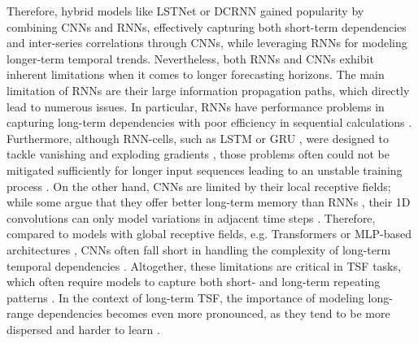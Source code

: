 \documentclass[a4paper,oneside,bibliography=totoc]{scrbook}
\begin{document}
Therefore, hybrid models like LSTNet \cite{lai_modeling_2018} or DCRNN \cite{li_diffusion_2018} gained popularity by combining CNNs and RNNs, effectively capturing both short-term dependencies and inter-series correlations through CNNs, while leveraging RNNs for modeling longer-term temporal trends. 
Nevertheless, both RNNs and CNNs exhibit inherent limitations when it comes to longer forecasting horizons. 
The main limitation of RNNs are their large information propagation paths, which directly lead to numerous issues.
In particular, RNNs have performance problems in capturing long-term dependencies with poor efficiency in sequential calculations \cite{jia_pgn_2024}.
Furthermore, although RNN-cells, such as LSTM \cite{hochreiter_long_1997} or GRU \cite{cho_learning_2014}, were designed to tackle vanishing and exploding gradients \cite{bengio_learning_1994}, those problems often could not be mitigated sufficiently for longer input sequences leading to an unstable training process \cite{zhou_informer_2021}. 
On the other hand, CNNs are limited by their local receptive fields; while some argue that they offer better long-term memory than RNNs \cite{bai_empirical_2018}, their 1D convolutions can only model variations in adjacent time steps \cite{wu_timesnet_2022}.
Therefore, compared to models with global receptive fields, e.g. Transformers \cite{vaswani_attention_2017} or MLP-based architectures \cite{zeng_are_2023}, CNNs often fall short in handling the complexity of long-term temporal dependencies \cite{donghao_moderntcn_2023}. 
Altogether, these limitations are critical in TSF tasks, which often require models to capture both short- and long-term repeating patterns \cite{lai_modeling_2018}. In the context of long-term TSF, the importance of modeling long-range dependencies becomes even more pronounced, as they tend to be more dispersed and harder to learn \cite{li_enhancing_2019}.
\end{document}
